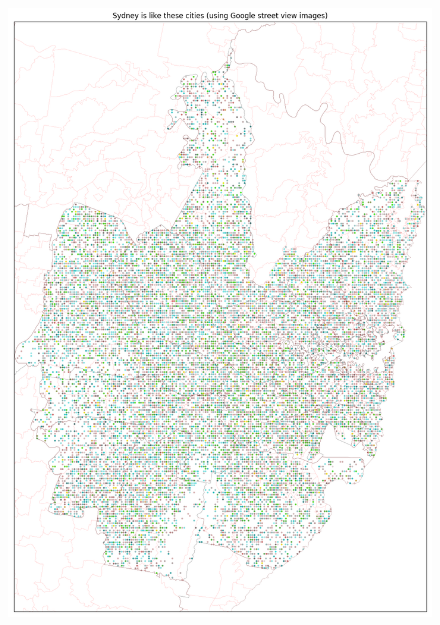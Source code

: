 \documentclass[sageh,times]{sagej}
\begin{document}
\begin{figure}[!htbp]
\centering    
\includegraphics[scale=0.20]{Images/SydneyOverall_street.png} 

\end{figure}
\end{document}
